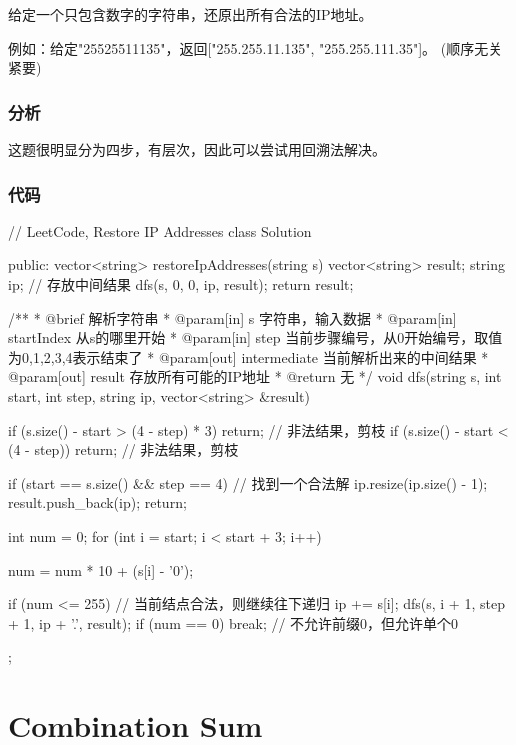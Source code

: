 给定一个只包含数字的字符串，还原出所有合法的IP地址。

例如：给定"25525511135"，返回["255.255.11.135", "255.255.111.35"]。 (顺序无关紧要)

\subsubsection{分析}
这题很明显分为四步，有层次，因此可以尝试用回溯法解决。

\subsubsection{代码}
\begin{Codex}[label=restore_ip_adresses.cpp]
// LeetCode, Restore IP Addresses
class Solution {
public:
    vector<string> restoreIpAddresses(string s) {
        vector<string> result;
        string ip; // 存放中间结果
        dfs(s, 0, 0, ip, result);
        return result;
    }

    /**
     * @brief 解析字符串
     * @param[in] s 字符串，输入数据
     * @param[in] startIndex 从s的哪里开始
     * @param[in] step 当前步骤编号，从0开始编号，取值为0,1,2,3,4表示结束了
     * @param[out] intermediate 当前解析出来的中间结果
     * @param[out] result 存放所有可能的IP地址
     * @return 无
     */
    void dfs(string s, int start, int step, string ip,
            vector<string> &result) {
        if (s.size() - start > (4 - step) * 3)
            return;  // 非法结果，剪枝
        if (s.size() - start < (4 - step))
            return;  // 非法结果，剪枝

        if (start == s.size() && step == 4) {  // 找到一个合法解
            ip.resize(ip.size() - 1);
            result.push_back(ip);
            return;
        }

        int num = 0;
        for (int i = start; i < start + 3; i++) {
            num = num * 10 + (s[i] - '0');

            if (num <= 255) {  // 当前结点合法，则继续往下递归
                ip += s[i];
                dfs(s, i + 1, step + 1, ip + '.', result);
            }
            if (num == 0) break;  // 不允许前缀0，但允许单个0
        }
    }
};
\end{Codex}


\section{Combination Sum} %

